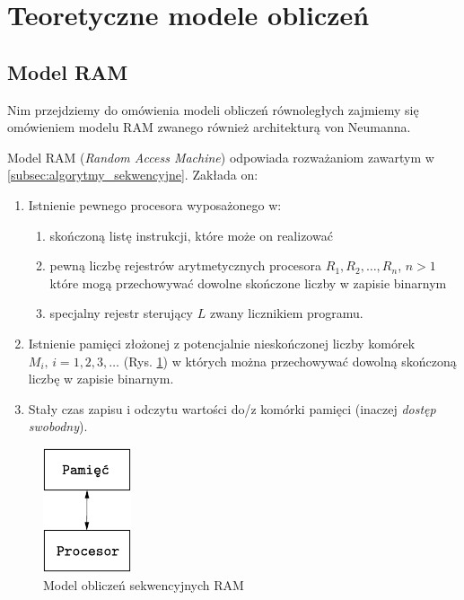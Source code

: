 \documentclass[a4paper,oneside,leqno,12pt]{book}
\theoremstyle{definition}
\theoremstyle{plain}
\theoremstyle{remark}
\begin{document}
\newpage


\section{Teoretyczne modele obliczeń }
\subsection{Model RAM}
Nim przejdziemy do omówienia modeli obliczeń równoległych zajmiemy się omówieniem modelu RAM zwanego również architekturą von Neumanna.

Model RAM (\emph{Random Access Machine}) odpowiada rozważaniom zawartym w \ref{subsec:algorytmy_sekwencyjne}. Zakłada on:

\begin{enumerate}
\item{Istnienie pewnego procesora wyposażonego w:
\begin{enumerate}
\item skończoną listę instrukcji, które może on realizować
\item pewną liczbę rejestrów arytmetycznych procesora \(R_1, R_2, \dots, R_n\), \(n>1\) które mogą przechowywać dowolne skończone liczby w zapisie binarnym
\item specjalny rejestr sterujący \(L\) zwany licznikiem programu.
\end{enumerate}}
\item Istnienie pamięci złożonej z potencjalnie nieskończonej liczby komórek \(M_i, \, i=1, 2, 3, \dots\) (Rys. \ref{fig:ram}) w których można przechowywać dowolną skończoną liczbę w zapisie binarnym.
\item Stały czas zapisu i odczytu wartości do/z komórki pamięci (inaczej \emph{dostęp swobodny}).

\end{enumerate}

\begin{figure}[h]
\centering
\includegraphics[width=7em]{./images/Rys_RAM.eps}
\caption{Model obliczeń sekwencyjnych RAM}
\label{fig:ram}
\end{figure}
\end{document}
